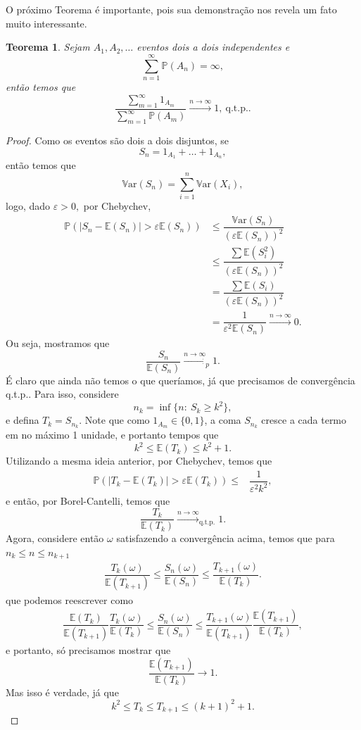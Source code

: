 \documentclass[12pt,a4paper,oneside]{book}
\newtheorem{theorem}{Teorema}[section]
\theoremstyle{definition}
\theoremstyle{remark}
\numberwithin{equation}{section}
\newcommand{\e}{\varepsilon}
\newcommand{\E}{\mathbb{E}}
\newcommand{\pr}{\mathbb{P}}
\newcommand{\ds}{\displaystyle}
\newcommand{\Var}{\mathbb{V}\text{ar}}
\newcommand{\rarrowlimn}{\xrightarrow{n\rightarrow \infty}}
\begin{document}
O próximo Teorema é importante, pois sua demonstração nos revela um fato muito interessante.


\begin{theorem}
Sejam $A_1,A_2,\dots$ eventos dois a dois independentes e 
$$\sum_{n=1}^\infty \pr(A_n) = \infty,$$
então temos que
$$\ds \dfrac{\sum_{m=1}^\infty 1_{A_m}}{\sum_{m=1}^\infty \pr(A_m)} \rarrowlimn 1,\ \textrm{q.t.p.}.$$
\end{theorem}


\begin{proof}
Como os eventos são dois a dois disjuntos, se 
$$S_n = 1_{A_1} + \dots+1_{A_n},$$
então temos que
$$\Var(S_n) = \sum_{i=1}^n \Var(X_i), $$
logo, dado $\e>0,$ por Chebychev,
\begin{align*}
\pr(|S_n-\E(S_n)| > \e\E(S_n))		&\leq \dfrac{\Var(S_n)}{(\e\E(S_n))^2}\\
						&\leq  \dfrac{\sum\E(S_i^2)}{(\e\E(S_n))^2}\\
						&=  \dfrac{\sum\E(S_i)}{(\e\E(S_n))^2}\\
						& = \dfrac{1}{\e^2\E(S_n)} \rarrowlimn 0.
\end{align*}
Ou seja, mostramos que 
$$ \dfrac{S_n}{\E(S_n)}\rarrowlimn_p 1.$$
É claro que ainda não temos o que queríamos, já que precisamos de convergência q.t.p.. 
Para isso, considere
$$n_k = \inf\{n:\ S_k\geq k^2\} ,$$
e defina $T_k = S_{n_k}$. Note que como $1_{A_m}\in\{0,1\}$, a coma $S_{n_k}$ cresce a cada termo em no máximo 1 unidade, e portanto tempos que
$$k^2\leq \E(T_k) \leq k^2+1.$$
Utilizando a mesma ideia anterior, por Chebychev, temos que
 \begin{align*}
\pr(|T_k-\E(T_k)| > \e\E(T_k))\leq	& \dfrac{1}{\e^2k^2},
\end{align*}
e então, por Borel-Cantelli, temos que
$$\dfrac{T_k}{\E(T_k)} \rarrowlimn_\textrm{q.t.p.} 1. $$
Agora, considere então $\omega$ satisfazendo a convergência acima, temos que para $n_k\leq n \leq n_{k+1}$ 
\begin{align*}
\dfrac{T_{k}(\omega)}{\E(T_{k+1})}\leq \dfrac{S_n(\omega)}{\E(S_n)}  \leq \dfrac{T_{k+1}(\omega)}{\E(T_{k})}.
\end{align*}
que podemos reescrever como
\begin{align*}
\dfrac{\E(T_{k})}{\E(T_{k+1})}\dfrac{T_{k}(\omega)}{\E(T_{k})}\leq \dfrac{S_n(\omega)}{\E(S_n)}  \leq \dfrac{T_{k+1}(\omega)}{\E(T_{k+1})}\dfrac{\E(T_{k+1})}{\E(T_{k})},
\end{align*}
e portanto, só precisamos mostrar que
$$\dfrac{\E(T_{k+1})}{\E(T_{k})} \longrightarrow 1. $$
Mas isso é verdade, já que
$$k^2 \leq T_k \leq T_{k+1}\leq (k+1)^2 + 1. $$

\end{proof}
\end{document}
